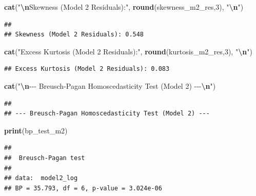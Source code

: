 \documentclass[
]{article}
\newenvironment{Shaded}{\begin{snugshade}}{\end{snugshade}}
\newcommand{\DecValTok}[1]{\textcolor[rgb]{0.00,0.00,0.81}{#1}}
\newcommand{\FunctionTok}[1]{\textcolor[rgb]{0.13,0.29,0.53}{\textbf{#1}}}
\newcommand{\NormalTok}[1]{#1}
\newcommand{\SpecialCharTok}[1]{\textcolor[rgb]{0.81,0.36,0.00}{\textbf{#1}}}
\newcommand{\StringTok}[1]{\textcolor[rgb]{0.31,0.60,0.02}{#1}}
\begin{document}
\begin{Shaded}
\begin{Highlighting}[]
    \FunctionTok{cat}\NormalTok{(}\StringTok{"}\SpecialCharTok{\textbackslash{}n}\StringTok{Skewness (Model 2 Residuals):"}\NormalTok{, }\FunctionTok{round}\NormalTok{(skewness\_m2\_res,}\DecValTok{3}\NormalTok{), }\StringTok{"}\SpecialCharTok{\textbackslash{}n}\StringTok{"}\NormalTok{)}
\end{Highlighting}
\end{Shaded}

\begin{verbatim}
## 
## Skewness (Model 2 Residuals): 0.548
\end{verbatim}

\begin{Shaded}
\begin{Highlighting}[]
    \FunctionTok{cat}\NormalTok{(}\StringTok{"Excess Kurtosis (Model 2 Residuals):"}\NormalTok{, }\FunctionTok{round}\NormalTok{(kurtosis\_m2\_res,}\DecValTok{3}\NormalTok{), }\StringTok{"}\SpecialCharTok{\textbackslash{}n}\StringTok{"}\NormalTok{)}
\end{Highlighting}
\end{Shaded}

\begin{verbatim}
## Excess Kurtosis (Model 2 Residuals): 0.083
\end{verbatim}

\begin{Shaded}
\begin{Highlighting}[]
    \FunctionTok{cat}\NormalTok{(}\StringTok{"}\SpecialCharTok{\textbackslash{}n}\StringTok{{-}{-}{-} Breusch{-}Pagan Homoscedasticity Test (Model 2) {-}{-}{-}}\SpecialCharTok{\textbackslash{}n}\StringTok{"}\NormalTok{)}
\end{Highlighting}
\end{Shaded}

\begin{verbatim}
## 
## --- Breusch-Pagan Homoscedasticity Test (Model 2) ---
\end{verbatim}

\begin{Shaded}
\begin{Highlighting}[]
    \FunctionTok{print}\NormalTok{(bp\_test\_m2)}
\end{Highlighting}
\end{Shaded}

\begin{verbatim}
## 
##  Breusch-Pagan test
## 
## data:  model2_log
## BP = 35.793, df = 6, p-value = 3.024e-06
\end{verbatim}
\end{document}
